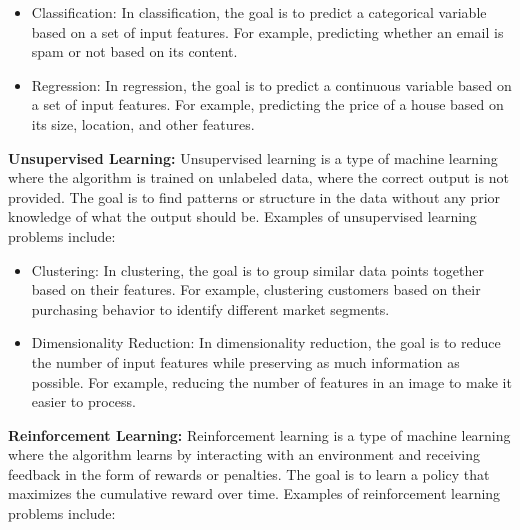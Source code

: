 \documentclass{article}
\begin{document}
\begin{itemize}
\item Classification: In classification, the goal is to predict a categorical variable based on a set of input features. For example, predicting whether an email is spam or not based on its content.
\item Regression: In regression, the goal is to predict a continuous variable based on a set of input features. For example, predicting the price of a house based on its size, location, and other features.
\end{itemize}
\textbf{Unsupervised Learning:}
Unsupervised learning is a type of machine learning where the algorithm is trained on unlabeled data, where the correct output is not provided. The goal is to find patterns or structure in the data without any prior knowledge of what the output should be. Examples of unsupervised learning problems include:

\begin{itemize}
\item Clustering: In clustering, the goal is to group similar data points together based on their features. For example, clustering customers based on their purchasing behavior to identify different market segments.
\item Dimensionality Reduction: In dimensionality reduction, the goal is to reduce the number of input features while preserving as much information as possible. For example, reducing the number of features in an image to make it easier to process.
\end{itemize}
\textbf{Reinforcement Learning:}
Reinforcement learning is a type of machine learning where the algorithm learns by interacting with an environment and receiving feedback in the form of rewards or penalties. The goal is to learn a policy that maximizes the cumulative reward over time. Examples of reinforcement learning problems include:
\end{document}
